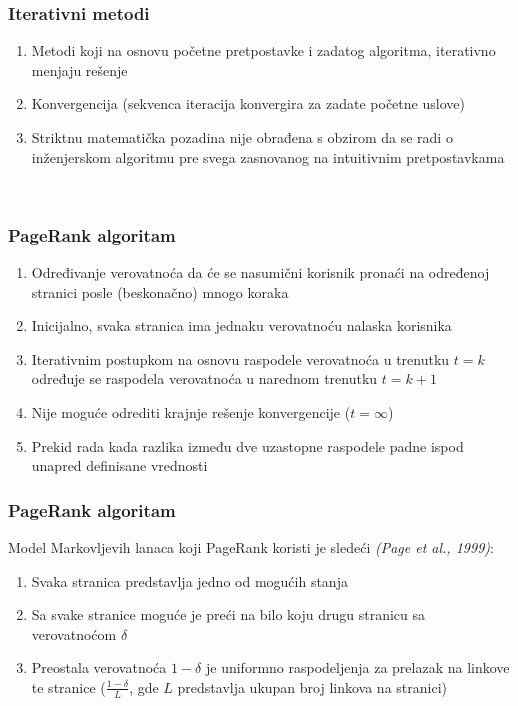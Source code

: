 \documentclass[11pt]{beamer}
\begin{document}
\begin{frame}
    \frametitle{Iterativni metodi}
  		\begin{center}
            \begin{enumerate}
                \item Metodi koji na osnovu početne pretpostavke i zadatog algoritma, iterativno menjaju rešenje
                \item Konvergencija (sekvenca iteracija konvergira za zadate početne uslove)
                \item Striktnu matematička pozadina nije obrađena s obzirom da se radi o inženjerskom algoritmu pre svega zasnovanog na intuitivnim pretpostavkama
            \end{enumerate}
            \leavevmode \\
        \end{center}
\end{frame}

\begin{frame}
    \frametitle{PageRank algoritam}
  		\begin{center}
            \begin{enumerate}
                \item Određivanje verovatnoća da će se nasumični korisnik pronaći na određenoj stranici posle (beskonačno) mnogo koraka
                \item Inicijalno, svaka stranica ima jednaku verovatnoću nalaska korisnika
                \item Iterativnim postupkom na osnovu raspodele verovatnoća u trenutku $t = k$ određuje se raspodela verovatnoća u narednom trenutku $t = k+1$
                \item Nije moguće odrediti krajnje rešenje konvergencije ($t = \infty$)
                \item Prekid rada kada razlika između dve uzastopne raspodele padne ispod unapred definisane vrednosti
            \end{enumerate}
        \end{center}
\end{frame}

\begin{frame}
    \frametitle{PageRank algoritam}
  		    Model Markovljevih lanaca koji PageRank koristi je sledeći \textit{(Page et al., 1999)}:
            \begin{enumerate}
                \item Svaka stranica predstavlja jedno od mogućih stanja
                \item Sa svake stranice moguće je preći na bilo koju drugu stranicu sa verovatnoćom $\delta$
                \item Preostala verovatnoća $1 - \delta$ je uniformno raspodeljenja za prelazak na linkove te stranice ($\frac{1-\delta}{L}$, gde $L$ predstavlja ukupan broj linkova na stranici)
            \end{enumerate}
\end{frame}
\end{document}
